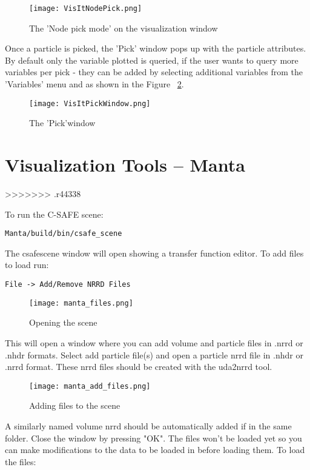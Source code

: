 \begin{figure}
  \center
  \texttt{[image: VisItNodePick.png]}
  \caption{The 'Node pick mode' on the visualization window}
  \label{VisItNodePick}
\end{figure}

Once a particle is picked, the 'Pick' window pops up with the particle attributes. By default only the variable plotted is queried, if the user wants to query more variables per pick - they can be added by selecting additional variables from the 'Variables' menu and as shown in the Figure ~\ref{VisItPickWindow}.

\begin{figure}
  \center
  \texttt{[image: VisItPickWindow.png]}
  \caption{The 'Pick'window }
  \label{VisItPickWindow}
\end{figure}

\chapter{Visualization Tools -- Manta}
>>>>>>> .r44338

To run the C-SAFE scene: 
\begin{Verbatim}[fontsize=\footnotesize]
  Manta/build/bin/csafe_scene
\end{Verbatim}

The csafescene window will open showing a transfer function editor.  To add files to load run:
\begin{Verbatim}[fontsize=\footnotesize]
  File -> Add/Remove NRRD Files
\end{Verbatim}

\begin{figure}[htbp]
  \center
  \texttt{[image: manta\_files.png]}
  \caption{Opening the scene}
  \label{fig:manta_files}
\end{figure}

This will open a window where you can add volume and particle files in .nrrd or .nhdr formats.  Select add particle file(s) and open a particle nrrd file in .nhdr or .nrrd format.  These nrrd files should be created with the uda2nrrd tool.

\begin{figure}[htbp]
  \center
  \texttt{[image: manta\_add\_files.png]}
  \caption{Adding files to the scene}
  \label{fig:manta_add_files}
\end{figure}

A similarly named volume nrrd should be automatically added if in the same folder.  Close the window by pressing "OK".  The files won't be loaded yet so you can make modifications to the data to be loaded in before loading them.  To load the files:

